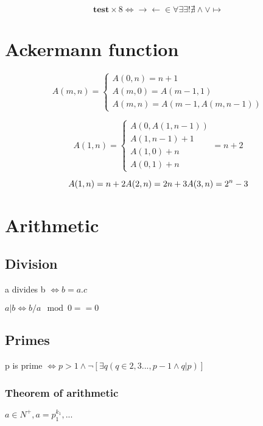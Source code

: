\documentclass{article}
\begin{document}
\newcommand{\congru}[3]{#1 \equiv #2\ (\text{mod}\ #3)}

\[
    \mathbf{test} \times 8
    \iff \to \gets \in \forall \exists \exists! \nexists
    \wedge \vee
    \mapsto
\]

\section{Ackermann function}

\[
    A(m, n) =
    \begin{cases}
        A(0, n) = n+1 \\
        A(m, 0) = A(m-1, 1) \\
        A(m, n) = A(m-1, A(m, n-1))
    \end{cases}
\]

\[
    A(1, n) =
    \begin{cases}
        A(0, A(1,n-1)) \\
        A(1, n-1) + 1 \\
        A(1, 0) + n \\
        A(0, 1) + n
    \end{cases}
    = n + 2
\]

\[
    A(1,n) = n+2 \\
    A(2,n) = 2n + 3 \\
    A(3,n) = 2^n - 3
\]

\section{Arithmetic}

\subsection{Division}

a divides b $\iff b = a . c$

$a | b \iff b/a \mod 0 == 0$

\subsection{Primes}

p is prime $\iff p > 1 \wedge \neg[\exists q(q \in {2,3...,p-1} \wedge q|p)]$

\subsubsection{Theorem of arithmetic}

$a \in N^+, a = p^{k_1}_1, ...$
\end{document}
